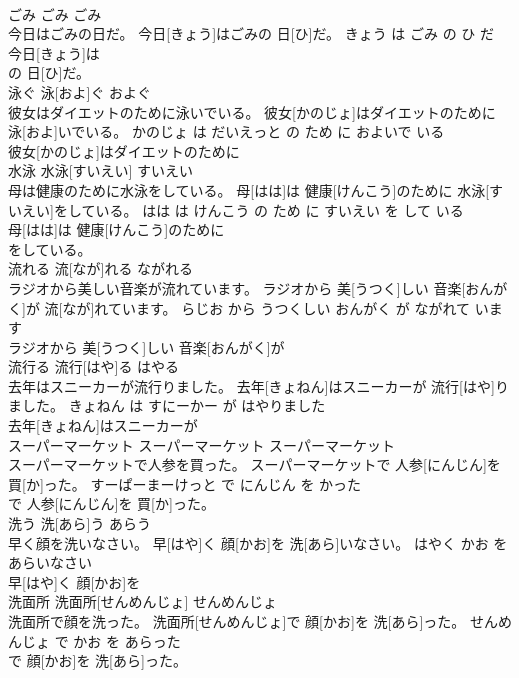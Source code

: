 \documentclass[8pt]{extreport}
\begin{document}
\begin{CJK}{UTF8}{min}
\\	ごみ	ごみ	ごみ	
\\	今日はごみの日だ。	今日[きょう]はごみの 日[ひ]だ。	きょう は ごみ の ひ だ	
\\	今日[きょう]は
\\	の 日[ひ]だ。			
\\	泳ぐ	泳[およ]ぐ	およぐ	
\\	彼女はダイエットのために泳いでいる。	彼女[かのじょ]はダイエットのために 泳[およ]いでいる。	かのじょ は だいえっと の ため に およいで いる	
\\	彼女[かのじょ]はダイエットのために
\\	水泳	水泳[すいえい]	すいえい	
\\	母は健康のために水泳をしている。	母[はは]は 健康[けんこう]のために 水泳[すいえい]をしている。	はは は けんこう の ため に すいえい を して いる	
\\	母[はは]は 健康[けんこう]のために
\\	をしている。			
\\	流れる	流[なが]れる	ながれる	
\\	ラジオから美しい音楽が流れています。	ラジオから 美[うつく]しい 音楽[おんがく]が 流[なが]れています。	らじお から うつくしい おんがく が ながれて います	
\\	ラジオから 美[うつく]しい 音楽[おんがく]が
\\	流行る	流行[はや]る	はやる	
\\	去年はスニーカーが流行りました。	去年[きょねん]はスニーカーが 流行[はや]りました。	きょねん は すにーかー が はやりました	
\\	去年[きょねん]はスニーカーが
\\	スーパーマーケット	スーパーマーケット	スーパーマーケット	
\\	スーパーマーケットで人参を買った。	スーパーマーケットで 人参[にんじん]を 買[か]った。	すーぱーまーけっと で にんじん を かった	
\\	で 人参[にんじん]を 買[か]った。			
\\	洗う	洗[あら]う	あらう	
\\	早く顔を洗いなさい。	早[はや]く 顔[かお]を 洗[あら]いなさい。	はやく かお を あらいなさい	
\\	早[はや]く 顔[かお]を
\\	洗面所	洗面所[せんめんじょ]	せんめんじょ	
\\	洗面所で顔を洗った。	洗面所[せんめんじょ]で 顔[かお]を 洗[あら]った。	せんめんじょ で かお を あらった	
\\	で 顔[かお]を 洗[あら]った。			

\end{CJK}
\end{document}

